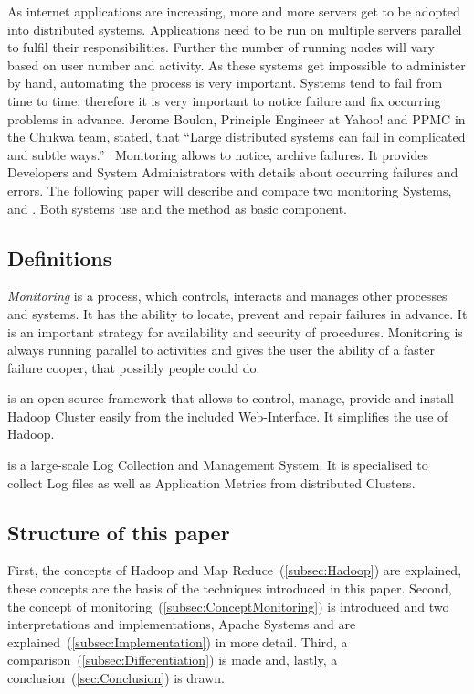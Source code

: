 As internet applications are increasing, more and more servers get to be adopted into distributed systems.\cite{Dinu2011} Applications need to be run on multiple servers parallel to fulfil their responsibilities. Further the number of running nodes will vary based on user number and activity.\cite{Jammes2012} As these systems get impossible to administer by hand, automating the process is very important.\cite{Jammes2012} Systems tend to fail from time to time, therefore it is very important to notice failure and fix occurring problems in advance. Jerome Boulon, Principle Engineer at Yahoo! and PPMC in the Chukwa team, stated, that ``Large distributed systems can fail in complicated and subtle ways.''~\cite{Boulonb} Monitoring allows to notice, archive failures. It provides Developers and System Administrators with details about occurring failures and errors. The following paper will describe and compare two monitoring Systems, \amb and \chuk. Both systems use \hadoop and the \mr method as basic component.


\subsection{Definitions}

\textit{Monitoring} is a process, which controls, interacts and manages other processes and systems. It has the ability to locate, prevent and repair failures in advance. It is an important strategy for availability and security of procedures. Monitoring is always running parallel to activities and gives the user the ability of a faster failure cooper, that possibly people could do.\cite{Jammes2012}

\amb is an open source framework that allows to control, manage, provide and install Hadoop Cluster easily from the included Web-Interface. It simplifies the use of Hadoop.\cite{Hortonworks2013}

\chuk is a large-scale Log Collection and Management System. It is specialised to collect Log files as well as Application Metrics from distributed Clusters.

\subsection{Structure of this paper}
First, the concepts of Hadoop and Map Reduce~(\ref{subsec:Hadoop}) are explained, these concepts are the basis of the techniques introduced in this paper. 
Second, the concept of monitoring~(\ref{subsec:ConceptMonitoring}) is introduced and two interpretations and implementations, Apache Systems \amb and \chuk are explained~(\ref{subsec:Implementation}) in more detail. 
Third, a comparison~(\ref{subsec:Differentiation}) is made and, lastly, a conclusion~(\ref{sec:Conclusion}) is drawn.

